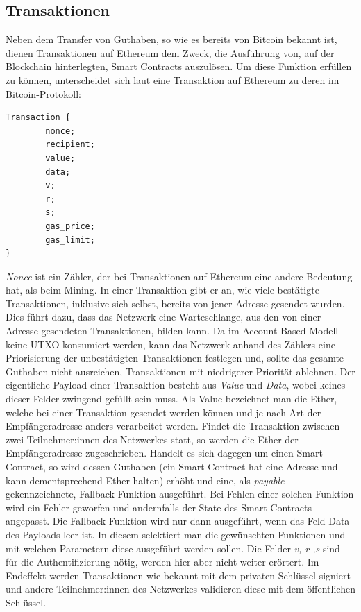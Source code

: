 \subsection{Transaktionen}
Neben dem Transfer von Guthaben, so wie es bereits von Bitcoin bekannt ist, dienen Transaktionen auf Ethereum dem Zweck, die Ausführung von, auf der Blockchain hinterlegten, Smart Contracts auszulösen.
Um diese Funktion erfüllen zu können, unterscheidet sich laut \cite{antanopoulos_2018} eine Transaktion auf Ethereum zu deren im Bitcoin-Protokoll:
\begin{lstlisting}[caption={Struktur einer Transaktion in Ethereum.},captionpos=b]
	Transaction {
		nonce;
		recipient;
		value;
		data;
		v;
		r;
		s;	
		gas_price;
		gas_limit;
}
\end{lstlisting}
\emph{Nonce} ist ein Zähler, der bei Transaktionen auf Ethereum eine andere Bedeutung hat, als beim Mining. In einer Transaktion gibt er an, wie viele bestätigte Transaktionen, inklusive sich selbst, bereits von jener Adresse gesendet wurden. Dies führt dazu, dass das Netzwerk eine Warteschlange, aus den von einer Adresse gesendeten Transaktionen, bilden kann. Da im Account-Based-Modell keine UTXO konsumiert werden, kann das Netzwerk anhand des Zählers eine Priorisierung der unbestätigten Transaktionen festlegen und, sollte das gesamte Guthaben nicht ausreichen, Transaktionen mit niedrigerer Priorität ablehnen.
Der eigentliche Payload einer Transaktion besteht aus \emph{Value} und \emph{Data}, wobei keines dieser Felder zwingend gefüllt sein muss.
Als Value bezeichnet man die Ether, welche bei einer Transaktion gesendet werden können und je nach Art der Empfängeradresse anders verarbeitet werden. Findet die Transaktion zwischen zwei Teilnehmer:innen des Netzwerkes statt, so werden die Ether der Empfängeradresse zugeschrieben. Handelt es sich dagegen um einen Smart Contract, so wird dessen Guthaben (ein Smart Contract hat eine Adresse und kann dementsprechend Ether halten) erhöht und eine, als \emph{payable} gekennzeichnete, Fallback-Funktion ausgeführt. Bei Fehlen einer solchen Funktion wird ein Fehler geworfen und andernfalls der State des Smart Contracts angepasst.
Die Fallback-Funktion wird nur dann ausgeführt, wenn das Feld Data des Payloads leer ist. In diesem selektiert man die gewünschten Funktionen und mit welchen Parametern diese ausgeführt werden sollen. Die Felder \emph{v, r ,s} sind für die Authentifizierung nötig, werden hier aber nicht weiter erörtert. Im Endeffekt werden Transaktionen wie bekannt mit dem privaten Schlüssel signiert und andere Teilnehmer:innen des Netzwerkes validieren diese mit dem öffentlichen Schlüssel.\\
